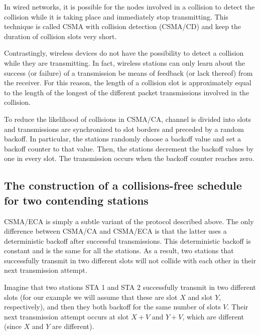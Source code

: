 \documentclass[journal]{IEEEtran}
\begin{document}
In wired networks, it is possible for the nodes involved in a collision to detect the collision while it is taking place and immediately stop transmitting.
This technique is called CSMA with collision detection (CSMA/CD) and keep the duration of collision slots very short.

Contrastingly, wireless devices do not have the possibility to detect a collision while they are transmitting.
In fact, wireless stations can only learn about the success (or failure) of a transmission be means of feedback (or lack thereof) from the receiver.
For this reason, the length of a collision slot is approximately equal to the length of the longest of the different packet transmissions involved in the collision.

To reduce the likelihood of collisions in CSMA/CA, channel is divided into slots and transmissions are synchronized to slot borders and preceded by a random backoff.
In particular, the stations randomly choose a backoff value and set a backoff counter to that value.
Then, the stations decrement the backoff values by one in every slot.
The transmission occurs when the backoff counter reaches zero.

\subsection{The construction of a collisions-free schedule for two contending stations}
CSMA/ECA is simply a subtle variant of the protocol described above.
The only difference between CSMA/CA and CSMA/ECA is that the latter uses a deterministic backoff after successful transmissions.
This deterministic backoff is constant and is the same for all the stations.
As a result, two stations that successfully transmit in two different slots will not collide with each other in their next transmission attempt.

Imagine that two stations STA 1 and STA 2 successfully transmit in two different slots (for our example we will assume that these are slot $X$ and slot $Y$, respectively),  and then they both backoff for the same number of slots $V$.
Their next transmission attempt occurs at slot $X+V$ and $Y+V$, which are different (since $X$ and $Y$ are different).
\end{document}

